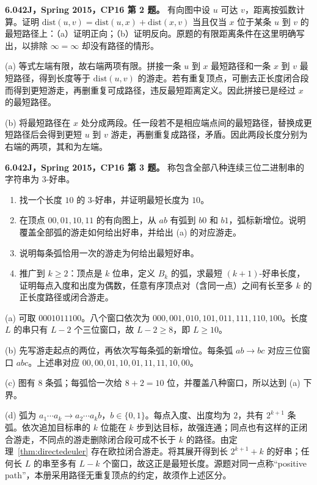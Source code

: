 \begin{exercise}\label{mit:6042-cp16-q2}
\textbf{6.042J，Spring 2015，CP16 第 2 题。}
有向图中设 $u$ 可达 $v$，距离按弧数计算。证明
$\mathrm{dist}(u,v)=\mathrm{dist}(u,x)+\mathrm{dist}(x,v)$ 当且仅当 $x$ 位于某条 $u$ 到 $v$ 的最短路径上：（a）证明正向；（b）证明反向。原题的有限距离条件在这里明确写出，以排除 $\infty=\infty$ 却没有路径的情形。
\end{exercise}
\begin{solution}
(a) 等式左端有限，故右端两项有限。拼接一条 $u$ 到 $x$ 最短路径和一条 $x$ 到 $v$ 最短路径，得到长度等于 $\mathrm{dist}(u,v)$ 的游走。若有重复顶点，可删去正长度闭合段而得到更短游走，再删重复可成路径，违反最短距离定义。因此拼接已是经过 $x$ 的最短路径。

(b) 将最短路径在 $x$ 处分成两段。任一段若不是相应端点间的最短路径，替换成更短路径后会得到更短 $u$ 到 $v$ 游走，再删重复成路径，矛盾。因此两段长度分别为右端的两项，其和为左端。
\end{solution}

\begin{exercise}\label{mit:6042-cp16-q3}
\textbf{6.042J，Spring 2015，CP16 第 3 题。}
称包含全部八种连续三位二进制串的字符串为 $3$-好串。
\begin{enumerate}[label=(\alph*)]
\item 找一个长度 $10$ 的 $3$-好串，并证明最短长度为 $10$。
\item 在顶点 $00,01,10,11$ 的有向图上，从 $ab$ 有弧到 $b0$ 和 $b1$，弧标新增位。说明覆盖全部弧的游走如何给出好串，并给出 (a) 的对应游走。
\item 说明每条弧恰用一次的游走为何给出最短好串。
\item 推广到 $k\ge2$：顶点是 $k$ 位串，定义 $B_k$ 的弧，求最短 $(k+1)$-好串长度，证明每点入度和出度为偶数，任意有序顶点对（含同一点）之间有长至多 $k$ 的正长度路径或闭合游走。
\end{enumerate}
\end{exercise}
\begin{solution}
(a) 可取 $0001011100$。八个窗口依次为 $000,001,010,101,011,111,110,100$。长度 $L$ 的串只有 $L-2$ 个三位窗口，故 $L-2\ge8$，即 $L\ge10$。

(b) 先写游走起点的两位，再依次写每条弧的新增位。每条弧 $ab\to bc$ 对应三位窗口 $abc$。上述串对应
$00,00,01,10,01,11,11,10,00$。

(c) 图有 $8$ 条弧；每弧恰一次给 $8+2=10$ 位，并覆盖八种窗口，所以达到 (a) 下界。

(d) 弧为 $a_1\cdots a_k\to a_2\cdots a_kb$，$b\in\{0,1\}$。每点入度、出度均为 $2$，共有 $2^{k+1}$ 条弧。依次追加目标串的 $k$ 位能在 $k$ 步到达目标，故强连通；同点也有这样的正闭合游走，不同点的游走删除闭合段可成不长于 $k$ 的路径。由定理~\ref{thm:directedeuler} 存在欧拉闭合游走。将其展开得到长 $2^{k+1}+k$ 的好串；任何长 $L$ 的串至多有 $L-k$ 个窗口，故这正是最短长度。源题对同一点称“positive path”，本册采用路径无重复顶点的约定，故须作上述区分。
\end{solution}

